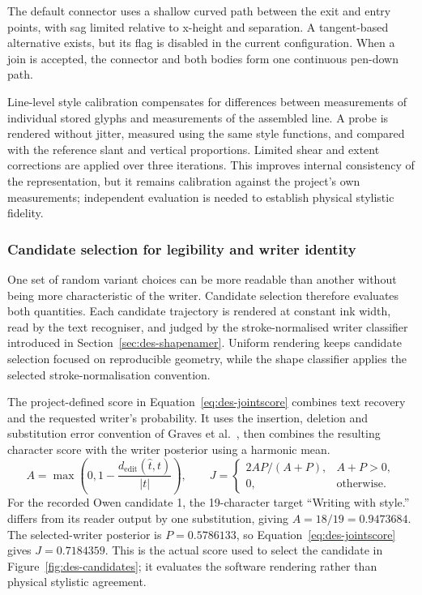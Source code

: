 The default connector uses a shallow curved path between the exit and entry points, with sag limited relative to x-height and separation. A tangent-based alternative exists, but its flag is disabled in the current configuration. When a join is accepted, the connector and both bodies form one continuous pen-down path.

Line-level style calibration compensates for differences between measurements of individual stored glyphs and measurements of the assembled line. A probe is rendered without jitter, measured using the same style functions, and compared with the reference slant and vertical proportions. Limited shear and extent corrections are applied over three iterations. This improves internal consistency of the representation, but it remains calibration against the project's own measurements; independent evaluation is needed to establish physical stylistic fidelity.

\subsubsection{Candidate selection for legibility and writer identity}
\label{sec:des-selection}
One set of random variant choices can be more readable than another without being more characteristic of the writer. Candidate selection therefore evaluates both quantities. Each candidate trajectory is rendered at constant ink width, read by the text recogniser, and judged by the stroke-normalised writer classifier introduced in Section~\ref{sec:des-shapenamer}. Uniform rendering keeps candidate selection focused on reproducible geometry, while the shape classifier applies the selected stroke-normalisation convention.

The project-defined score in Equation~\ref{eq:des-jointscore} combines text recovery and the requested writer's probability. It uses the insertion, deletion and substitution error convention of Graves et al.~\cite[p.~2]{graves2006}, then combines the resulting character score with the writer posterior using a harmonic mean.
\begin{equation}
A=\max\left(0,1-\frac{d_{\mathrm{edit}}(\widehat t,t)}{|t|}\right),\qquad
J=\begin{cases}2AP/(A+P),&A+P>0,\\0,&\text{otherwise}.\end{cases}
\label{eq:des-jointscore}
\end{equation}
For the recorded Owen candidate 1, the 19-character target ``Writing with style.'' differs from its reader output by one substitution, giving $A=18/19=0.9473684$. The selected-writer posterior is $P=0.5786133$, so Equation~\ref{eq:des-jointscore} gives $J=0.7184359$. This is the actual score used to select the candidate in Figure~\ref{fig:des-candidates}; it evaluates the software rendering rather than physical stylistic agreement.

